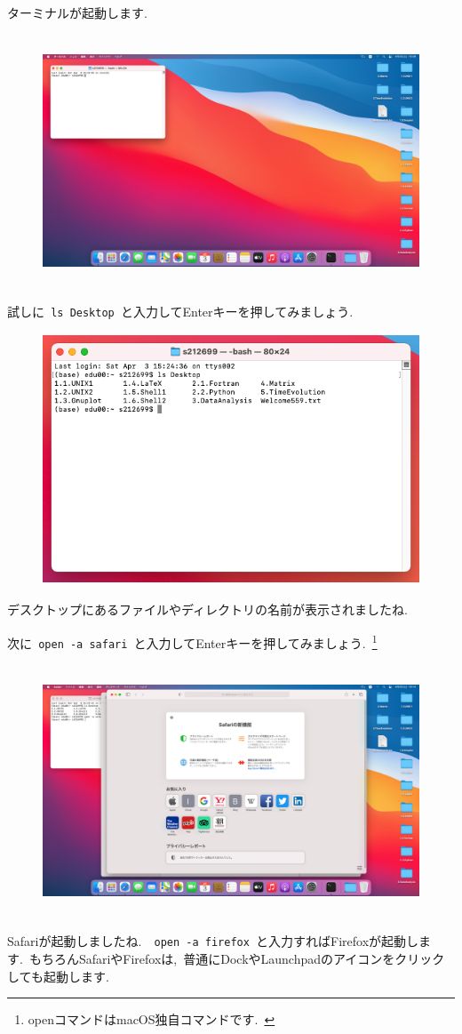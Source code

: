 \documentclass{jarticle}
\begin{document}
\newpage
ターミナルが起動します.\ 
\begin{figure}[H]
  \centering
  \includegraphics[height=7.5cm]{fig/MacTerminal.png}
\end{figure}

試しに\verb| ls Desktop |と入力してEnterキーを押してみましょう.\ 
\begin{figure}[H]
  \centering
  \includegraphics[height=7.5cm]{fig/MacTerminallsDesktop2.png}
\end{figure}
デスクトップにあるファイルやディレクトリの名前が表示されましたね.\ 

\newpage
次に\verb| open -a safari |と入力してEnterキーを押してみましょう.\ \footnote{openコマンドはmacOS独自コマンドです.\ }
\begin{figure}[H]
  \centering
  \includegraphics[height=7.5cm]{fig/MacTerminalOpenSafari.png}
\end{figure}
Safariが起動しましたね.\ \verb| open -a firefox |と入力すればFirefoxが起動します.\ 
もちろんSafariやFirefoxは,\ 普通にDockやLaunchpadのアイコンをクリックしても起動します.\\
\end{document}
